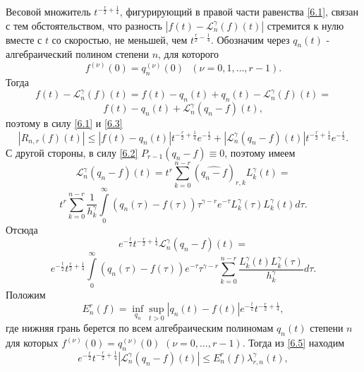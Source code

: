 Весовой множитель $t^{-\frac r2+\frac14}$, фигурирующий в правой части равенства \eqref{6.1}, связан с тем обстоятельством, что разность
$|f(t)-\mathcal{L}_n^\gamma(f)(t)|$ стремится к нулю вместе с $t$ со скоростью, не меньшей, чем  $t^{\frac r2-\frac14}$.
Обозначим через $q_n(t)$ - алгебраический полином степени $n$, для которого
\begin{equation}\label{6.2}
  f^{(\nu)}(0)=q_n^{(\nu)}(0)\text{ }(\nu=0,1,\ldots,r-1).
\end{equation}
Тогда
\begin{equation*}
  f(t)-\mathcal{L}_n^\gamma(f)(t)=f(t)-q_n(t)+q_n(t)-\mathcal{L}_n^\gamma(f)(t)=
\end{equation*}
\begin{equation}\label{6.3}
  f(t)-q_n(t)+\mathcal{L}_n^\gamma(q_n-f)(t),
\end{equation}
поэтому в силу \eqref{6.1} и \eqref{6.3}
\begin{equation}\label{6.4}
  |R_{n,r}(f)(t)|\le|f(t)-q_n(t)|t^{-\frac r2+\frac14}e^{-\frac t2}+|\mathcal{L}_n^\gamma(q_n-f)(t)|t^{-\frac r2+\frac14}e^{-\frac t2}.
\end{equation}
С другой стороны, в силу \eqref{6.2} $P_{r-1}(q_n-f)\equiv0$, поэтому  имеем
\begin{equation*}
  \mathcal{L}_n^\gamma(q_n-f)(t)=t^r\sum\limits_{k=0}^{n-r}(\widehat{q_n-f})_{r,k}L_k^\gamma(t)=
\end{equation*}
\begin{equation*}
  t^r\sum\limits_{k=0}^{n-r}\frac1{h_k^\gamma}\int\limits_0^\infty(q_n(\tau)-f(\tau))\tau^{\gamma-r}e^{-\tau}L_k^\gamma(\tau)L_k^\gamma(t)d\tau.
\end{equation*}
Отсюда
$$
e^{-\frac t2}t^{-\frac r2+\frac14}\mathcal{L}_n^\gamma(q_n-f)(t)=
$$
\begin{equation}\label{6.5}
  e^{-\frac t2}t^{\frac r2+\frac14}\int\limits_0^\infty(q_n(\tau)-f(\tau))e^{-\tau}\tau^{\gamma-r}\sum\limits_{k=0}^{n-r}\frac{L_k^\gamma(t)L_k^\gamma(\tau)}{h_k^\gamma}d\tau.
\end{equation}
Положим
\begin{equation}\label{6.6}
  E_n^r(f)=\inf\limits_{q_n}\sup\limits_{t>0}|q_n(t)-f(t)|e^{-\frac t2}t^{-\frac r2+\frac14},
\end{equation}
где нижняя грань берется по всем алгебраическим полиномам $q_n(t)$ степени $n$ для которых $f^{(\nu)}(0)=q_n^{(\nu)}(0)$ $(\nu=0,\ldots,r-1)$. Тогда из \eqref{6.5} находим
\begin{equation}\label{6.7}
 e^{-\frac{t}{2}} t^{-\frac r2+\frac14}|\mathcal{L}_n^\gamma(q_n-f)(t)|\le E_n^r(f)\lambda_{r,n}^\gamma(t),
\end{equation}
